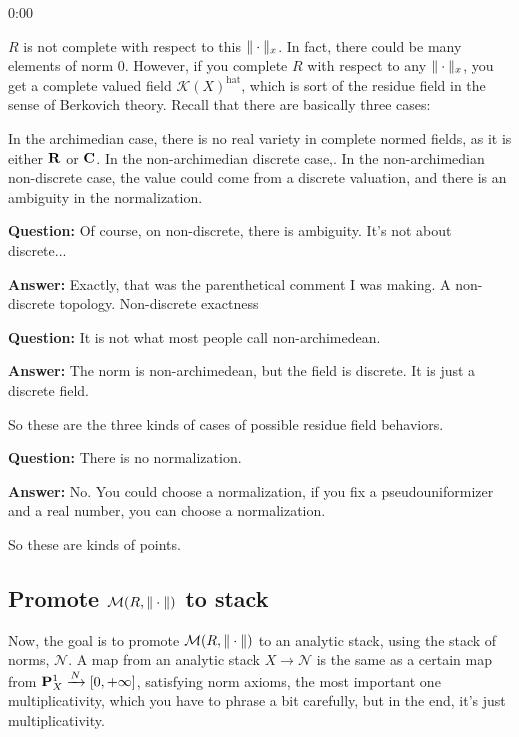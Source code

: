 \begin{unfinished}{0:00}
\begin{remark}
$R$ is not complete with respect to this $\norm{\cdot}_x$. In fact, there could be many elements of norm 0. However, if you complete $R$ with respect to any $\norm{\cdot}_x$, you get a complete valued field $\mathcal{K}(X)^{\text{hat}}$, which is sort of the residue field in the sense of Berkovich theory.
Recall that there are basically three cases:
\begin{enumerate}
\item archimedian $\iff$ $(\R, \norm{\cdot}^{\alpha})$ or $(\C, \norm{\cdot}^{\alpha)$, $\alpha \in [0, 1]$ by Ostrowski
\item non-archimedian but discrete, then you have the trivial norm $\norm{\cdot}_0 = \text{trivial norm}$
\item non-archimedian non-discrete, $\norm{\cdot}_{normalize}^{\alpha}, \alpha \in (0, \infty)$
\end{enumerate}
In the archimedian case, there is no real variety in complete normed fields, as it is either $\R$ or $\C$. In the non-archimedian discrete case,. In the non-archimedian non-discrete case, the value could come from a discrete valuation, and there is an ambiguity in the normalization.
\end{remark}

\textbf{Question:} Of course, on non-discrete, there is ambiguity. It's not about discrete... 

\textbf{Answer:} Exactly, that was the parenthetical comment I was making. A non-discrete topology. Non-discrete exactness 

\textbf{Question:} It is not what most people call non-archimedean. 

\textbf{Answer:} The norm is non-archimedean, but the field is discrete. It is just a discrete field.

So these are the three kinds of cases of possible residue field behaviors.

\textbf{Question:} There is no normalization.

\textbf{Answer:} No. You could choose a normalization, if you fix a pseudouniformizer and a real number, you can choose a normalization. 

So these are kinds of points.

\subsection{Promote $\BerkSpec(R, \norm{\cdot})$ to stack}
Now, the goal is to promote $\BerkSpec(R, \norm{\cdot})$ to an analytic stack, using the stack of norms, $\mathcal{N}$. A map from an analytic stack $X \to \mathcal{N}$ is the same as a certain map from $\P^1_X  \xrightarrow{N} [0, +\infty]$, satisfying norm axioms, the most important one multiplicativity, which you have to phrase a bit carefully, but in the end, it's just multiplicativity.


\end{unfinished}
